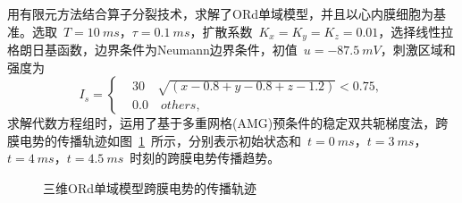 \documentclass[twoside,UTF8]{nputhesis}
\begin{document}
用有限元方法结合算子分裂技术，求解了ORd单域模型，并且以心内膜细胞为基准。选取~$T=10~ms$，$\tau=0.1~ms$，扩散系数~$K_x=K_y=K_z=0.01$，选择线性拉格朗日基函数，边界条件为Neumann边界条件，初值~$u=-87.5~mV$，刺激区域和强度为
\begin{equation*}
I_s=\left\{\begin{aligned}&30 \quad \sqrt{(x-0.8+y-0.8+z-1.2)}<0.75,\\
&0.0 \quad others,\end{aligned}\right.
\end{equation*}
求解代数方程组时，运用了基于多重网格(AMG)预条件的稳定双共轭梯度法，跨膜电势的传播轨迹如图~\ref{fig6}~所示，分别表示初始状态和~$t=0~ms$，$t=3~ms$，$t=4~ms$，$t=4.5~ms$~时刻的跨膜电势传播趋势。
\begin{figure}[htb]
	\centering
	{	  }
	\hspace{0.2\textwidth}
	\hspace{0.2\textwidth}
	\hspace{0.2\textwidth}
	\caption{三维ORd单域模型跨膜电势的传播轨迹}
	\label{fig6}
\end{figure}
\end{document}
